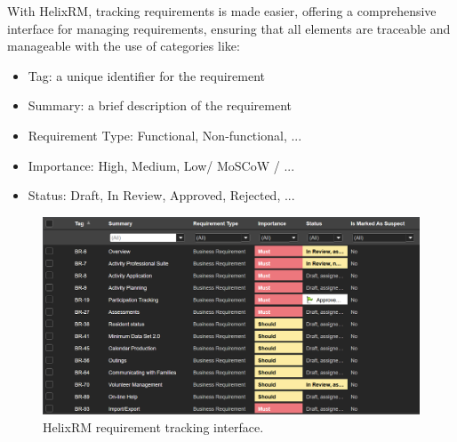 With HelixRM, tracking requirements is made easier, offering a
comprehensive interface for managing requirements,
ensuring that all elements are traceable and manageable with the use of categories like:
\begin{itemize}
    \item Tag: a unique identifier for the requirement
    \item Summary: a brief description of the requirement
    \item Requirement Type: Functional, Non-functional, ...
    \item Importance: High, Medium, Low/ MoSCoW / ...
    \item Status: Draft, In Review, Approved, Rejected, ...
\end{itemize}

\begin{figure}[htbp]
    \centerline{
        \includegraphics[width=\linewidth]
        {images/requirement-tracking}
    }
    \caption{HelixRM requirement tracking interface.}
    \label{fig}
\end{figure}


